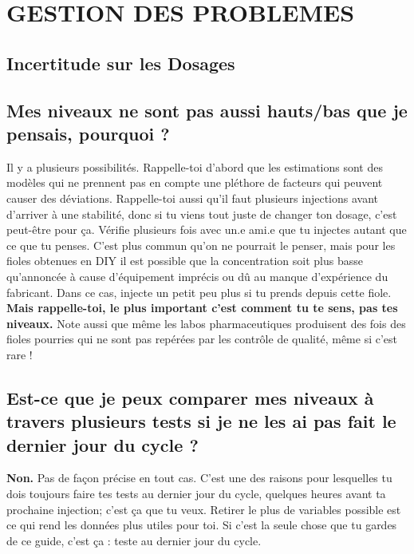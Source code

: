 \documentclass{article}
\begin{document}
\section{GESTION DES PROBLEMES}

\subsection*{Incertitude sur les Dosages}

\subsection{Mes niveaux ne sont pas aussi hauts/bas que je pensais, pourquoi ?}

Il y a plusieurs possibilités. Rappelle-toi d'abord que les estimations sont des modèles qui ne prennent pas en compte une pléthore de facteurs qui peuvent causer des déviations. Rappelle-toi aussi qu'il faut plusieurs injections avant d'arriver à une stabilité, donc si tu viens tout juste de changer ton dosage, c'est peut-être pour ça. Vérifie plusieurs fois avec un.e ami.e que tu injectes autant que ce que tu penses. C'est plus commun qu'on ne pourrait le penser, mais pour les fioles obtenues en DIY il est possible que la concentration soit plus basse qu'annoncée à cause d'équipement imprécis ou dû au manque d'expérience du fabricant. Dans ce cas, injecte un petit peu plus si tu prends depuis cette fiole. \textbf{Mais rappelle-toi, le plus important c'est comment tu te sens, pas tes niveaux.} Note aussi que même les labos pharmaceutiques produisent des fois des fioles pourries qui ne sont pas repérées par les contrôle de qualité, même si c'est rare !

\subsection{Est-ce que je peux comparer mes niveaux à travers plusieurs tests si je ne les ai pas fait le dernier jour du cycle ?}

\textbf{Non.} Pas de façon précise en tout cas. C'est une des raisons pour lesquelles tu dois toujours faire tes tests au dernier jour du cycle, quelques heures avant ta prochaine injection; c'est ça que tu veux. Retirer le plus de variables possible est ce qui rend les données plus utiles pour toi. Si c'est la seule chose que tu gardes de ce guide, c'est ça : teste au dernier jour du cycle.
\end{document}
